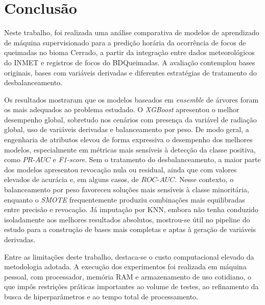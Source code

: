 
\chapter{Conclusão}
\label{cap:conclusao}

Neste trabalho, foi realizada uma análise comparativa de modelos de aprendizado de máquina supervisionado para a predição horária da ocorrência de focos de queimadas no bioma Cerrado, a partir da integração entre dados meteorológicos do INMET e registros de focos do BDQueimadas. A avaliação contemplou bases originais, bases com variáveis derivadas e diferentes estratégias de tratamento do desbalanceamento.

Os resultados mostraram que os modelos baseados em \textit{ensemble} de árvores foram os mais adequados ao problema estudado. O \textit{XGBoost} apresentou o melhor desempenho global, sobretudo nos cenários com presença da variável de radiação global, uso de variáveis derivadas e balanceamento por peso. De modo geral, a engenharia de atributos elevou de forma expressiva o desempenho dos melhores modelos, especialmente em métricas mais sensíveis à detecção da classe positiva, como $PR\text{-}AUC$ e \textit{F1-score}. Sem o tratamento do desbalanceamento, a maior parte dos modelos apresentou revocação nula ou residual, ainda que com valores elevados de acurácia e, em alguns casos, de $ROC\text{-}AUC$. Nesse contexto, o balanceamento por peso favoreceu soluções mais sensíveis à classe minoritária, enquanto o \textit{SMOTE} frequentemente produziu combinações mais equilibradas entre precisão e revocação. Já imputação por KNN, embora não tenha conduzido isoladamente aos melhores resultados absolutos, mostrou-se útil no pipeline do estudo para a construção de bases mais completas e aptas à geração de variáveis derivadas.

Entre as limitações deste trabalho, destaca-se o custo computacional elevado da metodologia adotada. A execução dos experimentos foi realizada em máquina pessoal, com processador, memória RAM e armazenamento de uso cotidiano, o que impôs restrições práticas importantes ao volume de testes, ao refinamento da busca de hiperparâmetros e ao tempo total de processamento. 


